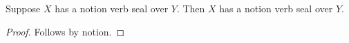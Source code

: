 

\begin{proposition}\label{notion_verb_import}
    Suppose $X$ has a notion verb seal over $Y$.
    Then $X$ has a notion verb seal over $Y$.
\end{proposition}
\begin{proof}
    Follows by notion.
\end{proof}
